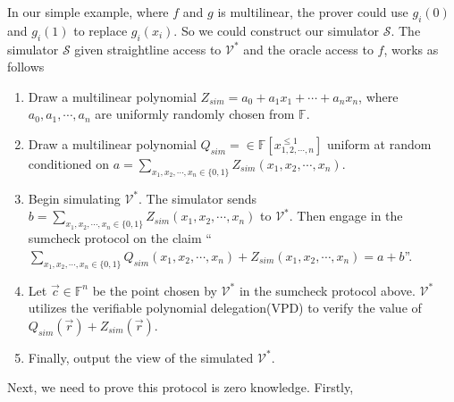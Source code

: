\noindent
In our simple example, where $f$ and $g$ is multilinear, the prover could use $g_i(0)$ and $g_i(1)$ to replace $g_i(x_i)$. So we could construct our simulator $\mathcal{S}$. The simulator $\mathcal{S}$ given straightline access to $\mathcal{V^*}$ and the oracle access to $f$, works as follows

\begin{enumerate}

\item Draw a multilinear polynomial $Z_{sim} = a_0 + a_1x_1 + \cdots + a_nx_n$, where $a_0, a_1, \cdots, a_n$ are uniformly randomly chosen from $\mathbb{F}$. 

\item Draw a multilinear polynomial $Q_{sim} = \in \mathbb{F}[x_{1, 2, \cdots, n}^{\leq 1}]$ uniform at random conditioned on $a = \sum\limits_{x_1, x_2, \cdots, x_n \in \{0, 1\}}Z_{sim}(x_1, x_2, \cdots, x_n)$.

\item Begin simulating $\mathcal{V}^*$. The simulator sends $b = \sum\limits_{x_1, x_2, \cdots, x_n \in \{0, 1\}}Z_{sim}(x_1, x_2, \cdots, x_n)$ to $\mathcal{V}^*$. Then engage in the sumcheck protocol on the claim ``$\sum\limits_{x_1, x_2, \cdots, x_n \in \{0, 1\}}Q_{sim}(x_1, x_2, \cdots, x_n) + Z_{sim}(x_1, x_2, \cdots, x_n) = a + b$''. 

\item Let $\vec{c} \in \mathbb{F}^n$ be the point chosen by $\mathcal{V}^*$ in the sumcheck protocol above. $\mathcal{V}^*$ utilizes the verifiable polynomial delegation(VPD) to verify the value of $Q_{sim}(\vec{r}) + Z_{sim}(\vec{r})$. 

\item Finally, output the view of the simulated $\mathcal{V}^*$. 

\end{enumerate} 

Next, we need to prove this protocol is zero knowledge. Firstly, 


























